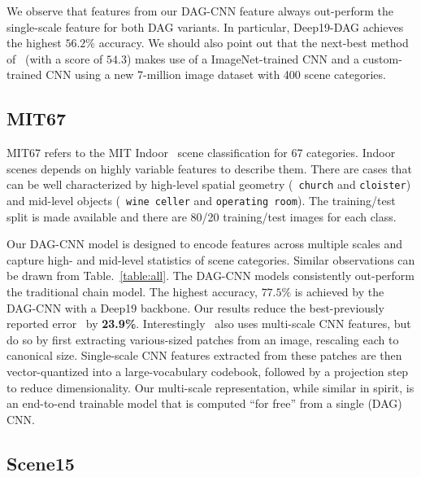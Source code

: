 \documentclass[10pt,twocolumn,letterpaper]{article}
\begin{document}
We observe that features from our DAG-CNN feature always out-perform the single-scale feature for both DAG variants. In particular, Deep19-DAG achieves the highest $56.2\%$ accuracy. We should also point out that the next-best method of~\cite{zhoulearning} (with a score of $54.3$) makes use of a ImageNet-trained CNN and a custom-trained CNN using a new 7-million image dataset with 400 scene categories.

\subsection{MIT67}

MIT67 refers to the MIT Indoor~\cite{MIT67} scene classification for 67 categories. Indoor scenes depends on highly variable features to describe them. There are cases that can be well characterized by high-level spatial geometry (\eg~{\tt church} and {\tt cloister}) and mid-level objects (\eg~{\tt wine celler} and {\tt operating room}). The training/test split is made available and there are 80/20 training/test images for each class.

Our DAG-CNN model is designed to encode features across multiple scales and capture high- and mid-level statistics of scene categories. Similar observations can be drawn from Table.~\ref{table:all}. The DAG-CNN models consistently out-perform the traditional chain model. The highest accuracy, $77.5\%$ is achieved by the DAG-CNN with a Deep19 backbone. Our results reduce the best-previously reported error~\cite{Gong14} by {\bf 23.9\%}. Interestingly~\cite{Gong14} also uses multi-scale CNN features, but do so by first extracting various-sized patches from an image, rescaling each to canonical size. Single-scale CNN features extracted from these patches are then vector-quantized into a large-vocabulary codebook, followed by a projection step to reduce dimensionality. Our multi-scale representation, while similar in spirit, is an end-to-end trainable model that is computed ``for free'' from a single (DAG) CNN.


\subsection{Scene15}
\end{document}
